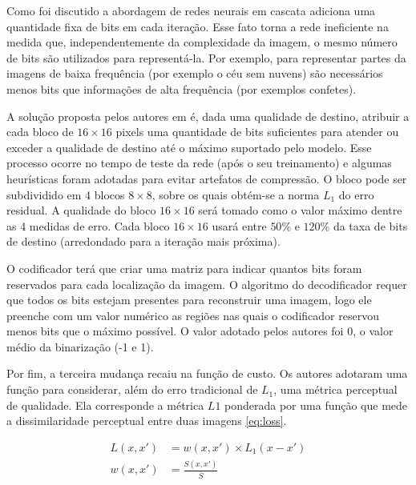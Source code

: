 
Como foi discutido a abordagem de redes neurais em cascata adiciona uma quantidade fixa de bits em cada iteração. Esse fato torna a rede ineficiente na medida que, independentemente da complexidade da imagem, o mesmo número de bits são utilizados para representá-la.  Por exemplo, para representar partes da imagens de baixa frequência (por exemplo o céu sem nuvens) são necessários menos bits que informações de alta frequência (por exemplos confetes).

A solução proposta pelos autores em \cite{Priming2017Johnston} é, dada uma qualidade de destino, atribuir a cada bloco de $16 \times 16$ pixels uma quantidade de bits suficientes para atender ou exceder a qualidade de destino até o máximo suportado pelo modelo.
Esse processo ocorre no tempo de teste da rede (após o seu treinamento) e algumas  heurísticas foram adotadas para evitar artefatos de compressão. O bloco pode ser subdividido em 4 blocos  $8 \times 8$, sobre os quais obtém-se a norma $L_1$ do erro residual. A qualidade do bloco $16 \times 16$ será tomado como o valor máximo dentre as 4 medidas de erro. Cada bloco $16 \times 16$ usará entre $50\%$ e $120\%$ da taxa de bits de destino (arredondado para a iteração mais próxima). 

O codificador terá que criar uma matriz para indicar quantos bits foram reservados para cada localização da imagem. O algoritmo do decodificador requer que todos os bits estejam presentes para reconstruir uma imagem, logo ele preenche com um valor numérico as regiões nas quais o codificador reservou menos bits que o máximo possível. O valor adotado pelos autores foi 0, o valor médio da binarização (-1 e 1). 


Por fim, a terceira mudança recaiu na função de custo. Os autores adotaram uma função para considerar, além do erro tradicional de $L_1$, uma métrica perceptual de qualidade. Ela corresponde a métrica $L1$ ponderada por uma função que mede a dissimilaridade perceptual entre duas imagens \ref{eq:loss}.    

\begin{equation}
\label{eq:loss}     
\begin{aligned}
L(x,x') &= w(x,x') \times L_1(x-x') \\ 
w(x,x') &= \frac{S(x,x')}{\bar{S}} 
\end{aligned}
\end{equation}

